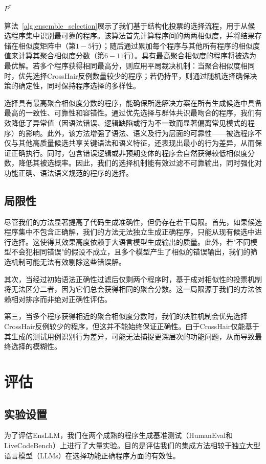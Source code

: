 \documentclass{article}
\newcommand{\tool}{EnsLLM}
\begin{document}
\begin{CJK*}{UTF8}{gbsn}
\begin{algorithm}[t!]
\begin{algorithmic}[1]
\State \Return \( P^* \)

\end{algorithmic}
\end{algorithm}

算法~\ref{alg:ensemble_selection}展示了我们基于结构化投票的选择流程，用于从候选程序集中识别最可靠的程序。该算法首先计算程序间的两两相似度，并将结果存储在相似度矩阵中（第$1-5$行）；随后通过累加每个程序与其他所有程序的相似度值来计算其聚合相似度分数（第$6-11$行）。具有最高聚合相似度的程序将被选为最优解。若多个程序获得相同最高分，则应用平局裁决机制：当聚合相似度相同时，优先选择CrossHair反例数量较少的程序；若仍持平，则通过随机选择确保决策的确定性，同时保持程序选择的多样性。

选择具有最高聚合相似度分数的程序，能确保所选解决方案在所有生成候选中具备最高的一致性、可靠性和容错性。通过优先选择与群体共识最吻合的程序，我们有效降低了异常值（因语法错误、逻辑缺陷或行为不一致而显著偏离常见模式的程序）的影响。此外，该方法增强了语法、语义及行为层面的可靠性——被选程序不仅与其他高质量候选共享关键语法和语义特征，还表现出最小的行为差异，从而保证正确执行。同时，包含错误逻辑或非预期变体的程序会自然获得较低相似度分数，降低其被选概率。因此，我们的选择机制能有效过滤不可靠输出，同时强化对功能正确、语法语义规范的程序的选择。
\subsection{局限性}

尽管我们的方法显著提高了代码生成准确性，但仍存在若干局限。首先，如果候选程序集中不包含正确解，我们的方法无法独立生成正确程序，只能从现有候选中进行选择。这使得其效果高度依赖于大语言模型生成输出的质量。此外，若"不同模型不会犯相同错误"的假设不成立，且多个模型产生了相似的错误输出，我们的筛选机制可能无法有效剔除这些错误解。

其次，当经过初始语法正确性过滤后仅剩两个程序时，基于成对相似性的投票机制将无法区分二者，因为它们总会获得相同的聚合分数。这一局限源于我们的方法依赖相对排序而非绝对正确性评估。

第三，当多个程序获得相近的聚合相似度分数时，我们的决胜机制会优先选择CrossHair反例较少的程序，但这并不能始终保证正确性。由于CrossHair仅能基于其生成的测试用例识别行为差异，可能无法捕捉更深层次的功能问题，从而导致最终选择的模糊性。
\section{评估}


\subsection{实验设置}
为了评估\tool，我们在两个成熟的程序生成基准测试（HumanEval和LiveCodeBench）上进行了大量实验。目的是评估我们的集成方法相较于独立大型语言模型（LLMs）在选择功能正确程序方面的有效性。

\end{CJK*}
\end{document}
